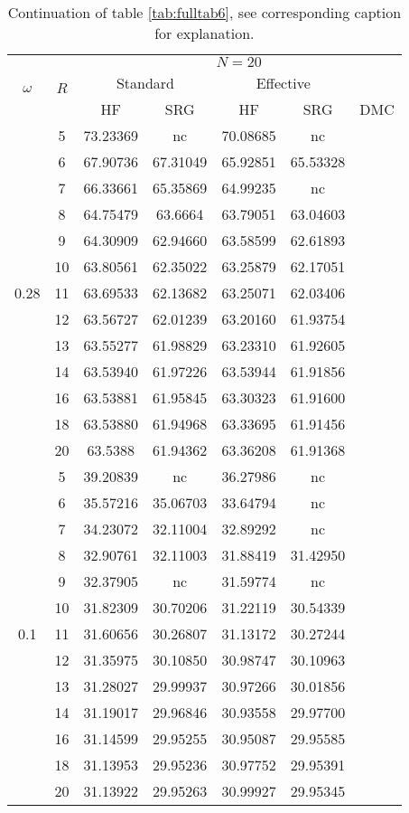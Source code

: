 \begin{table}
\begin{center}
\tabcolsep=0.35cm
\begin{tabular}{|c|c|c|c|c|c|c|}
\hline
\multirow{3}{*}{$\omega$} & \multirow{3}{*}{$R$} & \multicolumn{5}{|c|}{$N=20$} \\
& & \multicolumn{2}{|c|}{Standard} & \multicolumn{2}{|c|}{Effective} &  \\
& & HF & SRG & HF & SRG & DMC \\
\hline\hline
\multirow{13}{*}{0.28} & 5& 73.23369&nc & 70.08685&nc & \multirow{13}{*}{} \\
& 6&67.90736 &67.31049 & 65.92851 &65.53328 & \\
& 7&66.33661 &65.35869 & 64.99235 &nc & \\
& 8&64.75479 &63.6664 & 63.79051 & 63.04603 & \\
& 9&64.30909 &62.94660 &63.58599 &62.61893 & \\
& 10&63.80561 &62.35022 &63.25879 &62.17051 & \\
& 11&63.69533 &62.13682 &63.25071 &62.03406 & \\
& 12&63.56727  & 62.01239 &63.20160 &61.93754 & \\
&13& 63.55277 & 61.98829 &63.23310 & 61.92605 & \\
&14 &63.53940 &61.97226 &63.53944 &61.91856 & \\
&16 &63.53881 &61.95845 &63.30323 &61.91600 & \\ 
& 18&63.53880 & 61.94968 & 63.33695&61.91456 & \\
& 20 &63.5388 &61.94362 &63.36208 & 61.91368 & \\
\hline
\multirow{13}{*}{0.1} & 5&39.20839 &nc &36.27986 &nc & \multirow{13}{*}{} \\
& 6&35.57216 &35.06703 &33.64794 &nc & \\
& 7&34.23072 &32.11004 &32.89292 &nc & \\
& 8&32.90761 &32.11003 &31.88419 &31.42950 & \\
& 9&32.37905 &nc &31.59774 &nc & \\
& 10&31.82309 &30.70206 &31.22119 & 30.54339 & \\
& 11&31.60656 &30.26807 &31.13172 &30.27244 & \\
& 12 &31.35975 &30.10850 &30.98747 &30.10963 & \\
& 13 &31.28027 &29.99937 &30.97266 &30.01856 & \\
&14 &31.19017 &29.96846 &30.93558 &29.97700 & \\
&16 &31.14599 &29.95255 &30.95087 &29.95585 & \\
& 18&31.13953 & 29.95236 &30.97752 &29.95391 & \\
& 20 &31.13922 &29.95263 & 30.99927 &29.95345 & \\
\hline
\end{tabular}
\end{center}
\caption{Continuation of table \ref{tab:fulltab6}, see corresponding caption for explanation.}
\label{tab:fulltab6_2}
\end{table}

